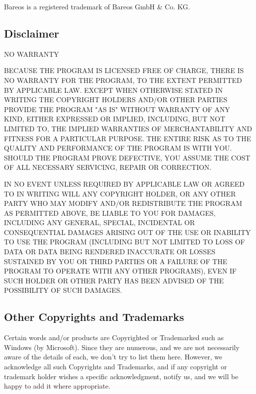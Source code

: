 Bareos\raisebox{.6ex}{\textsuperscript{\textregistered}} is a registered
trademark of Bareos GmbH \& Co. KG.

\subsection*{Disclaimer}

NO WARRANTY

BECAUSE THE PROGRAM IS LICENSED FREE OF CHARGE, THERE IS NO WARRANTY FOR THE
PROGRAM, TO THE EXTENT PERMITTED BY APPLICABLE LAW. EXCEPT WHEN OTHERWISE
STATED IN WRITING THE COPYRIGHT HOLDERS AND/OR OTHER PARTIES PROVIDE THE
PROGRAM "AS IS" WITHOUT WARRANTY OF ANY KIND, EITHER EXPRESSED OR IMPLIED,
INCLUDING, BUT NOT LIMITED TO, THE IMPLIED WARRANTIES OF MERCHANTABILITY AND
FITNESS FOR A PARTICULAR PURPOSE. THE ENTIRE RISK AS TO THE QUALITY AND
PERFORMANCE OF THE PROGRAM IS WITH YOU. SHOULD THE PROGRAM PROVE DEFECTIVE,
YOU ASSUME THE COST OF ALL NECESSARY SERVICING, REPAIR OR CORRECTION.

IN NO EVENT UNLESS REQUIRED BY APPLICABLE LAW OR AGREED TO IN WRITING WILL ANY
COPYRIGHT HOLDER, OR ANY OTHER PARTY WHO MAY MODIFY AND/OR REDISTRIBUTE THE
PROGRAM AS PERMITTED ABOVE, BE LIABLE TO YOU FOR DAMAGES, INCLUDING ANY
GENERAL, SPECIAL, INCIDENTAL OR CONSEQUENTIAL DAMAGES ARISING OUT OF THE USE
OR INABILITY TO USE THE PROGRAM (INCLUDING BUT NOT LIMITED TO LOSS OF DATA OR
DATA BEING RENDERED INACCURATE OR LOSSES SUSTAINED BY YOU OR THIRD PARTIES OR
A FAILURE OF THE PROGRAM TO OPERATE WITH ANY OTHER PROGRAMS), EVEN IF SUCH
HOLDER OR OTHER PARTY HAS BEEN ADVISED OF THE POSSIBILITY OF SUCH DAMAGES.

\subsection*{Other Copyrights and Trademarks}

Certain words and/or products are Copyrighted or Trademarked such as Windows (by Microsoft). Since
they are numerous, and we are not necessarily aware of the details of each, we don’t try to list them here.
However, we acknowledge all such Copyrights and Trademarks, and if any copyright or trademark holder
wishes a specific acknowledgment, notify us, and we will be happy to add it where appropriate.
